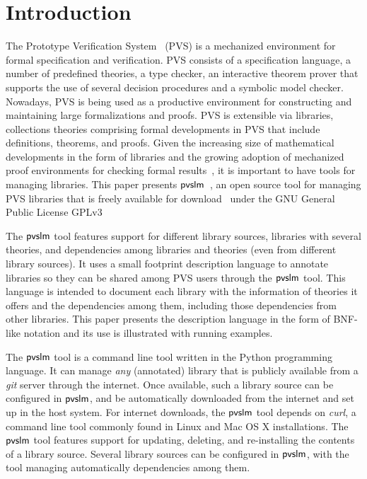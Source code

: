 \section{Introduction}
\label{sec.intro}

The Prototype Verification System~\cite{pvs-cade92} (PVS) is a
mechanized environment for formal specification and verification.  PVS
consists of a specification language, a number of predefined theories,
a type checker, an interactive theorem prover that supports the use of
several decision procedures and a symbolic model checker.  Nowadays,
PVS is being used as a productive environment for constructing and
maintaining large formalizations and proofs. PVS is extensible via
libraries, collections theories comprising formal developments in PVS
that include definitions, theorems, and proofs. Given the increasing
size of mathematical developments in the form of libraries and the
growing adoption of mechanized proof environments for checking formal
results~\cite{}, it is important to have tools for managing
libraries. This paper presents $\textsf{pvslm}$~\cite{pvslm}, an open source
tool for managing PVS libraries that is freely available for
download~\cite{pvslm} under the GNU General Public License GPLv3

The $\textsf{pvslm}$ tool features support for different library sources,
libraries with several theories, and dependencies among libraries and
theories (even from different library sources). It uses a small
footprint description language to annotate libraries so they can be
shared among PVS users through the $\textsf{pvslm}$ tool. This language is
intended to document each library with the information of theories it
offers and the dependencies among them, including those dependencies
from other libraries. This paper presents the description language in
the form of BNF-like notation and its use is illustrated with running
examples.

The $\textsf{pvslm}$ tool is a command line tool written in the Python
programming language. It can manage {\em any} (annotated) library that
is publicly available from a {\em git} server through the internet.
Once available, such a library source can be configured in $\textsf{pvslm}$,
and be automatically downloaded from the internet and set up in the
host system. For internet downloads, the $\textsf{pvslm}$ tool depends on {\em
  curl}, a command line tool commonly found in Linux and Mac OS X
installations. The $\textsf{pvslm}$ tool features support for updating,
deleting, and re-installing the contents of a library source.  Several
library sources can be configured in $\textsf{pvslm}$, with the tool managing
automatically dependencies among them.

